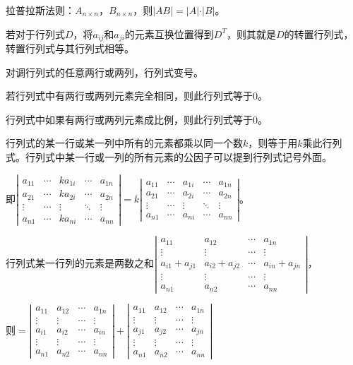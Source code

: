 \documentclass[UTF8, 12pt]{ctexart}
\begin{document}
拉普拉斯法则：$A_{n\times n}$，$B_{n\times n}$，则$\vert AB\vert=\vert A\vert\cdot\vert B\vert$。

若对于行列式$D$，将$a_{ij}$和$a_{ji}$的元素互换位置得到$D^T$，则其就是$D$的转置行列式，转置行列式与其行列式相等。

对调行列式的任意两行或两列，行列式变号。

若行列式中有两行或两列元素完全相同，则此行列式等于0。

行列式中如果有两行或两列元素成比例，则此行列式等于0。

行列式的某一行或某一列中所有的元素都乘以同一个数$k$，则等于用$k$乘此行列式。行列式中某一行或一列的所有元素的公因子可以提到行列式记号外面。

即$
\left|\begin{array}{ccccc} 
    a_{11} & \cdots & ka_{1i} & \cdots & a_{1n} \\
    a_{21} & \cdots & ka_{2i} & \cdots & a_{2n} \\
    \vdots & \cdots & \vdots & \ddots & \vdots \\
    a_{n1} & \cdots & ka_{ni} & \cdots & a_{nn}
\end{array}\right| 
=k\left|\begin{array}{ccccc} 
    a_{11} & \cdots & a_{1i} & \cdots & a_{1n} \\
    a_{21} & \cdots & a_{2i} & \cdots & a_{2n} \\
    \vdots & \cdots & \vdots & \ddots & \vdots \\
    a_{n1} & \cdots & a_{ni} & \cdots & a_{nn}
\end{array}\right|$。

行列式某一行列的元素是两数之和$
\left|\begin{array}{cccc} 
    a_{11} & a_{12} & \cdots & a_{1n} \\
    \vdots & \vdots & \cdots & \vdots \\
    a_{i1}+a_{j1} & a_{i2}+a_{j2} & \cdots & a_{in}+a_{jn} \\
    \vdots & \vdots & \cdots & \vdots \\
    a_{n1} & a_{n2} & \cdots & a_{nn}
\end{array}\right| 
$，

则$=\left|\begin{array}{cccc} 
    a_{11} & a_{12} & \cdots & a_{1n} \\
    \vdots & \vdots & \cdots & \vdots \\
    a_{i1} & a_{i2} & \cdots & a_{in}\\
    \vdots & \vdots & \cdots & \vdots \\
    a_{n1} & a_{n2} & \cdots & a_{nn}
\end{array}\right|+
\left|\begin{array}{cccc} 
    a_{11} & a_{12} & \cdots & a_{1n} \\
    \vdots & \vdots & \cdots & \vdots \\
    a_{j1} & a_{j2} & \cdots & a_{jn} \\
    \vdots & \vdots & \cdots & \vdots \\
    a_{n1} & a_{n2} & \cdots & a_{nn}
\end{array}\right|$
\end{document}
